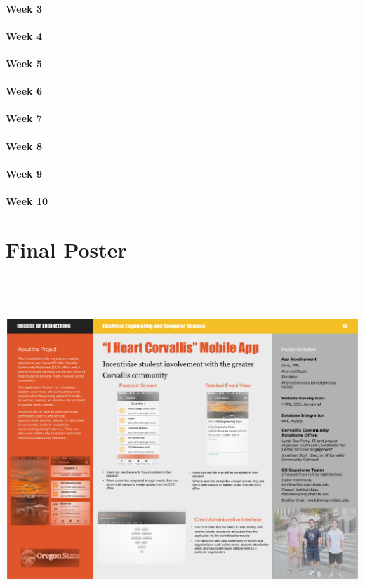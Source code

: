 \documentclass[onecolumn, draftclsnofoot,10pt, compsoc]{IEEEtran}
\begin{document}
      \paragraph{Week 3}
      \paragraph{Week 4}
      \paragraph{Week 5}
      \paragraph{Week 6}
      \paragraph{Week 7}
      \paragraph{Week 8}
      \paragraph{Week 9}
      \paragraph{Week 10}
  \newpage

\section{Final Poster}
  \includegraphics[height=13cm]{poster}
  \newpage
\end{document}
